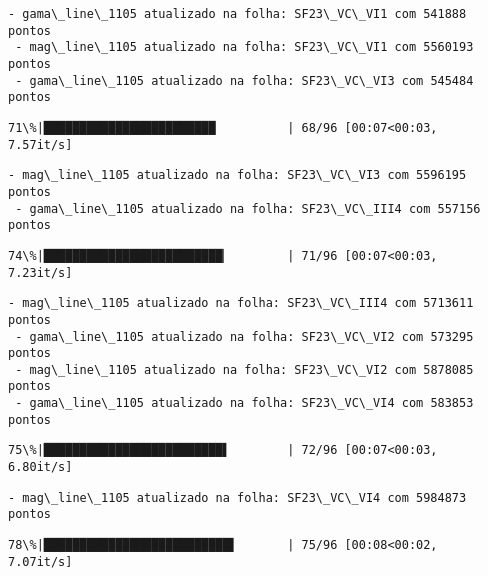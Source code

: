 \documentclass[11pt]{article}
\begin{document}
    \begin{Verbatim}[commandchars=\\\{\}]
 - gama\_line\_1105 atualizado na folha: SF23\_VC\_VI1 com 541888 pontos
 - mag\_line\_1105 atualizado na folha: SF23\_VC\_VI1 com 5560193 pontos
 - gama\_line\_1105 atualizado na folha: SF23\_VC\_VI3 com 545484 pontos
    \end{Verbatim}

    \begin{Verbatim}[commandchars=\\\{\}]
 71\%|████████████████████████          | 68/96 [00:07<00:03,  7.57it/s]
    \end{Verbatim}

    \begin{Verbatim}[commandchars=\\\{\}]
 - mag\_line\_1105 atualizado na folha: SF23\_VC\_VI3 com 5596195 pontos
 - gama\_line\_1105 atualizado na folha: SF23\_VC\_III4 com 557156 pontos
    \end{Verbatim}

    \begin{Verbatim}[commandchars=\\\{\}]
 74\%|█████████████████████████▏        | 71/96 [00:07<00:03,  7.23it/s]
    \end{Verbatim}

    \begin{Verbatim}[commandchars=\\\{\}]
 - mag\_line\_1105 atualizado na folha: SF23\_VC\_III4 com 5713611 pontos
 - gama\_line\_1105 atualizado na folha: SF23\_VC\_VI2 com 573295 pontos
 - mag\_line\_1105 atualizado na folha: SF23\_VC\_VI2 com 5878085 pontos
 - gama\_line\_1105 atualizado na folha: SF23\_VC\_VI4 com 583853 pontos
    \end{Verbatim}

    \begin{Verbatim}[commandchars=\\\{\}]
 75\%|█████████████████████████▌        | 72/96 [00:07<00:03,  6.80it/s]
    \end{Verbatim}

    \begin{Verbatim}[commandchars=\\\{\}]
 - mag\_line\_1105 atualizado na folha: SF23\_VC\_VI4 com 5984873 pontos
    \end{Verbatim}

    \begin{Verbatim}[commandchars=\\\{\}]
 78\%|██████████████████████████▌       | 75/96 [00:08<00:02,  7.07it/s]
    \end{Verbatim}
\end{document}

